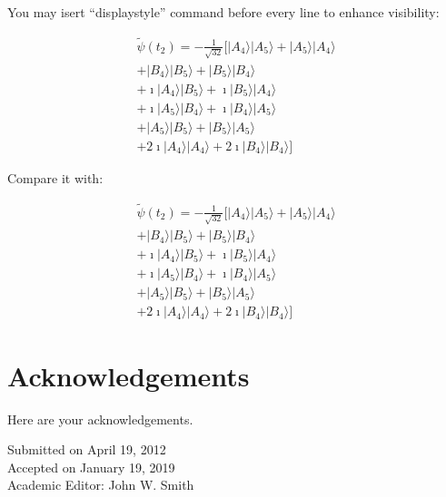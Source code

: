 \documentclass[12pt]{article}
\begin{document}
You may isert ``displaystyle'' command before every line to enhance visibility:

\begin{equation}
\begin{array}{cc}
\displaystyle\tilde{\psi}(t_{2})=-\frac{1}{\sqrt{32}}[|A_{4}\rangle|A_{5}\rangle+|A_{5}\rangle|A_{4}\rangle \\
\displaystyle+|B_{4}\rangle|B_{5}\rangle+|B_{5}\rangle|B_{4}\rangle \\
\displaystyle+\imath|A_{4}\rangle|B_{5}\rangle+\imath|B_{5}\rangle|A_{4}\rangle \\
\displaystyle+\imath|A_{5}\rangle|B_{4}\rangle+\imath|B_{4}\rangle|A_{5}\rangle \\
\displaystyle+|A_{5}\rangle|B_{5}\rangle+|B_{5}\rangle|A_{5}\rangle \\
\displaystyle+2\imath|A_{4}\rangle|A_{4}\rangle+2\imath|B_{4}\rangle|B_{4}\rangle]
\end{array}
\end{equation}

Compare it with:

\begin{equation}
\begin{array}{cc}
\tilde{\psi}(t_{2})=-\frac{1}{\sqrt{32}}[|A_{4}\rangle|A_{5}\rangle+|A_{5}\rangle|A_{4}\rangle\\
+|B_{4}\rangle|B_{5}\rangle+|B_{5}\rangle|B_{4}\rangle\\
+\imath|A_{4}\rangle|B_{5}\rangle+\imath|B_{5}\rangle|A_{4}\rangle\\
+\imath|A_{5}\rangle|B_{4}\rangle+\imath|B_{4}\rangle|A_{5}\rangle\\
+|A_{5}\rangle|B_{5}\rangle+|B_{5}\rangle|A_{5}\rangle\\
+2\imath|A_{4}\rangle|A_{4}\rangle+2\imath|B_{4}\rangle|B_{4}\rangle]
\end{array}
\end{equation}

\section*{Acknowledgements}

Here are your acknowledgements.

\begin{flushleft}
\footnotesize Submitted on April 19, 2012 \\
\footnotesize Accepted on January 19, 2019 \\
\footnotesize Academic Editor: John W. Smith
\end{flushleft}
\end{document}
